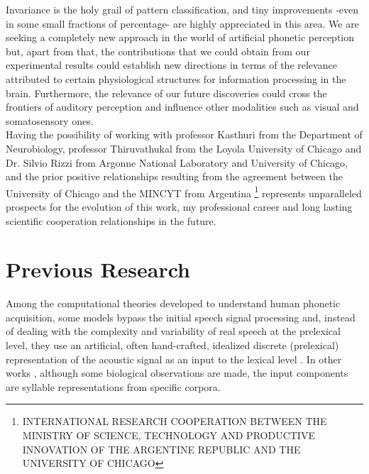 \documentclass[11pt,a4paper]{article}
\begin{document}
Invariance is the holy grail of pattern classification,
and tiny improvements -even in some small fractions
of percentage- are highly appreciated in this area.
We are seeking a completely new approach in the world of
artificial phonetic perception but, apart from that,
the contributions that we could obtain from our
experimental results could establish new directions
in terms of the relevance attributed
to certain physiological
structures for information processing in the brain.
Furthermore, the relevance of our future discoveries
could cross the frontiers of auditory perception
and influence other modalities
such as visual and somatosensory ones. \\

Having the possibility of working with professor
Kasthuri from the Department of Neurobiology,
professor Thiruvathukal from the Loyola University of Chicago and
Dr. Silvio Rizzi from Argonne National Laboratory and University of Chicago,
and the prior positive relationships resulting from the agreement
between the University of Chicago and the MINCYT from Argentina
\footnote{INTERNATIONAL RESEARCH COOPERATION BETWEEN THE MINISTRY OF SCIENCE,
TECHNOLOGY AND PRODUCTIVE INNOVATION
OF THE ARGENTINE REPUBLIC
AND
THE UNIVERSITY OF CHICAGO}
represents unparalleled prospects for the
evolution of this work, my professional career
and long lasting scientific cooperation
relationships in the future. \\
























\section{Previous Research}

Among the computational theories developed to understand
human phonetic acquisition, some models bypass the initial
speech signal processing and,
instead of dealing with the complexity and variability of real speech
at the prelexical level, they use an artificial, often hand-crafted, 
idealized discrete (prelexical) representation of the acoustic
signal as an input to the lexical level \cite{scharenborg_2010}.
In other works \cite{dominey_2000}, although some biological observations are made,
the input components are syllable representations from specific corpora.\\
\end{document}
